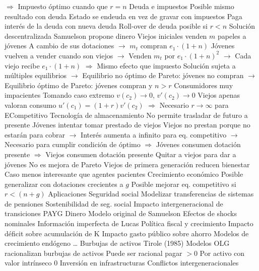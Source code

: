\documentclass{nuevotema}
\begin{document}
\begin{esquemal}
				\4[] $\Rightarrow$ Impuesto óptimo cuando que $r=n$
				\4 Deuda e impuestos
				\4[] Posible mismo resultado con deuda
				\4[] Estado se endeuda en vez de gravar con impuestos
				\4[] Paga interés de la deuda con nueva deuda
				\4[] Roll-over de deuda posible si $r<n$
			\3 Solución descentralizada
				\4 Samuelson propone dinero
				\4 Viejos iniciales venden $m$ papeles a jóvenes
				\4 A cambio de sus dotaciones
				\4[] $\to$ $m_t$ compran $e_1 \cdot (1+n)$
				\4 Jóvenes vuelven a vender cuando son viejos
				\4[] $\to$ Venden $m_t$ por $e_1 \cdot (1+n)^2$
				\4[] $\to$ Cada viejo recibe $e_1 \cdot (1+n)$
				\4[] $\Rightarrow$ Mismo efecto que impuesto
				\4 Solución sujeta a múltiples equilibrios
				\4[] $\to$ Equilibrio no óptimo de Pareto: jóvenes no compran
				\4[] $\to$ Equilibrio óptimo de Pareto: jóvenes compran y $n>r$
			\3 Consumidores muy impacientes
				\4 Tomando caso extremo
				\4[] $v(c_2) \to 0$, $v'(c_2) \to 0$
				\4[] Viejos apenas valoran consumo
				\4[] $u'(c_1) = (1+r) v'(c_2)$
				\4[] $\Rightarrow$ Necesario $r \to \infty$ para ECompetitivo
				\4 Tecnología de almacenamiento
				\4[] No permite trasladar de futuro a presente
				\4 Jóvenes intentar tomar prestado de viejos
				\4[] Viejos no prestan porque no estarán para cobrar
				\4[] $\to$ Interés aumenta a infinito para eq. competitivo
				\4[] $\to$ Necesario para cumplir condición de óptimo
				\4[] $\Rightarrow$ Jóvenes consumen dotación presente
				\4[] $\Rightarrow$ Viejos consumen dotación presente
				\4 Quitar a viejos para dar a jóvenes
				\4[] No es mejora de Pareto
				\4[] Viejos de primera generación reducen bienestar
				\4[$\Rightarrow$] Caso menos interesante que agentes pacientes
			\3 Crecimiento económico
				\4 Posible generalizar con dotaciones crecientes a $g$
				\4[$\Rightarrow$] Posible mejorar eq. competitivo si $r<(n+g)$
		\2 Aplicaciones
			\3 Seguridad social
				\4 Modelizar transferencias de sistemas de pensiones
				\4 Sostenibilidad de seg. social
				\4 Impacto intergeneracional de transiciones PAYG
			\3 Dinero
				\4 Modelo original de Samuelson
				\4 Efectos de shocks nominales
				\4[] Información imperfecta de Lucas
			\3 Política fiscal y crecimiento
				\4 Impacto déficit sobre acumulación de K
				\4 Impacto gasto público sobre ahorro
				\4 Modelos de crecimiento endógeno
				\4[] \ldots
			\3 Burbujas de activos
				\4 Tirole (1985)
				\4 Modelos OLG racionalizan burbujas de activos
				\4[] Puede ser racional pagar $>0$
				\4[] Por activo con valor intrínseco 0
			\3 Inversión en infrastructuras
				\4 Conflictos intergeneracionales

\end{esquemal}
\end{document}
